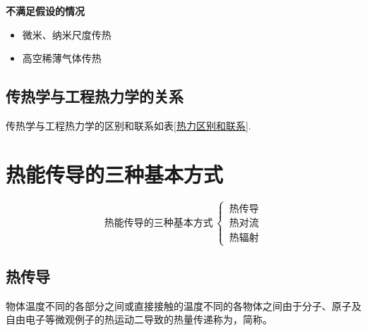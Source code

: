 \noindent \textbf{不满足假设的情况}\vspace*{-0.5em}
\begin{itemize}
	\item 微米、纳米尺度传热\vspace*{-0.5em}
	\item 高空稀薄气体传热
\end{itemize}

\subsection{传热学与工程热力学的关系}
传热学与工程热力学的区别和联系如表\ref{热力区别和联系}.

\begin{table}[!htb]
	\centering 
\caption{传热学与工程热力学的区别和联系}
\label{热力区别和联系}
\end{table}

\section{热能传导的三种基本方式}
\begin{equation*}
	\mbox{热能传导的三种基本方式}\,
	\begin{cases}
		\, \mbox{热传导}\\
		\, \mbox{热对流}\\
		\, \mbox{热辐射}
	\end{cases}
\end{equation*}

\subsection{热传导}
\tdefination[热传导]
物体温度不同的各部分之间或直接接触的温度不同的各物体之间由于分子、原子及自由电子等微观例子的热运动二导致的热量传递称为，简称。\vspace*{0.5em}

